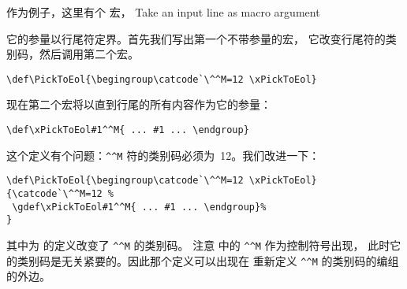 \documentclass[letterpaper]{book}
\begin{document}
作为例子，这里有个 \label{pick:eol} 宏，
\howto Take an input line as macro argument\par
它的参量以行尾符定界。首先我们写出第一个不带参量的宏，
它改变行尾符的类别码，然后调用第二个宏。
\begin{verbatim}
\def\PickToEol{\begingroup\catcode`\^^M=12 \xPickToEol}
\end{verbatim}
现在第二个宏将以直到行尾的所有内容作为它的参量：
\begin{verbatim}
\def\xPickToEol#1^^M{ ... #1 ... \endgroup}
\end{verbatim}
这个定义有个问题：\verb>^^M> 符的类别码必须为~12。我们改进一下：
\begin{verbatim}
\def\PickToEol{\begingroup\catcode`\^^M=12 \xPickToEol}
{\catcode`\^^M=12 %
 \gdef\xPickToEol#1^^M{ ... #1 ... \endgroup}%
}
\end{verbatim}
其中为  的定义改变了 \verb>^^M> 的类别码。
注意  中的 \verb>^^M> 作为控制符号出现，
此时它的类别码是无关紧要的。因此那个定义可以出现在
重新定义 \verb>^^M> 的类别码的编组的外边。
\end{document}
